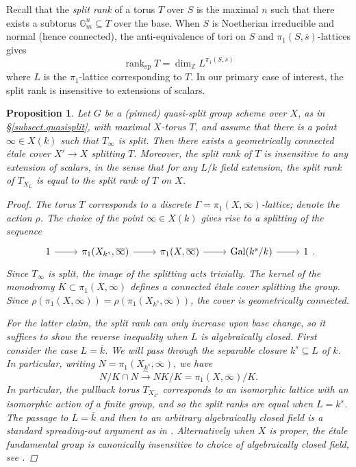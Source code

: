 \documentclass[openany]{amsbook}
\newtheorem{proposition}[theorem]{Proposition}
\theoremstyle{definition}
\theoremstyle{remark}
\numberwithin{equation}{section}
\newcommand{\Z}{\mathbb{Z}}
\newcommand{\G}{\mathbb{G}}
\newcommand{\ol}[1]{\overline{#1}}
\newcommand{\Gal}{\operatorname{Gal}}
\renewcommand{\-}{\operatorname{-}}
\newcommand{\on}[1]{\operatorname{#1}}
\newcommand{\rank}{\on{rank}}
\renewcommand{\sp}{\on{sp}}
\begin{document}
Recall that the \emph{split rank} of a torus $T$ over $S$ is the maximal $n$ such that there exists a subtorus $\G^n_m \subseteq T$ over the base. When $S$ is Noetherian irreducible and normal (hence connected), the anti-equivalence of tori on $S$ and $\pi_1(S, \ol{s})$-lattices gives
\[
    \rank_{\sp} T = \dim_{\Z} L^{\pi_1(S, \ol{s})}
\]
where $L$ is the $\pi_1$-lattice corresponding to $T$. In our primary case of interest, the split rank is insensitive to extensions of scalars.
\begin{proposition}\label{prop.splitrankextensions}
     Let $G$ be a (pinned) quasi-split group scheme over $X$, as in \S \ref{subsect.quasisplit}, with maximal $X$-torus $T$, and assume that there is a point $\infty \in X(k)$ such that $T_{\infty}$ is split. Then there exists a geometrically connected \'etale cover $X' \to X$ splitting $T$. Moreover, the split rank of $T$ is insensitive to any extension of scalars, in the sense that for \textit{any} $L/k$ field extension, the split rank of $T_{X_L}$ is equal to the split rank of $T$ on $X$.
    \begin{proof}
        The torus $T$ corresponds to a discrete $\Gamma = \pi_1(X, \ol{\infty})$-lattice; denote the action $\rho$. The choice of the point $\infty \in X(k)$ gives rise to a splitting of the sequence 
        \[
            \begin{tikzcd}[ampersand replacement=\&]
                1 \ar[r] \& \pi_1(X_{k^s}, \ol{\infty}) \ar[r] \& \pi_1(X, \ol{\infty}) \ar[r] \& \Gal(k^s/k) \ar[r] \& 1
            \end{tikzcd}.
        \]
        Since $T_\infty$ is split, the image of the splitting acts trivially. The kernel of the monodromy $K \subset \pi_1(X, \ol{\infty})$ defines a connected \'etale cover splitting the group. Since $\rho(\pi_1(X, \ol{\infty})) = \rho(\pi_1(X_{k^s}, \ol{\infty}))$, the cover is geometrically connected.
        
        For the latter claim, the split rank can only increase upon base change, so it suffices to show the reverse inequality when $L$ is algebraically closed.  First consider the case $L = \ol{k}$. We will pass through the separable closure $k^s \subseteq L$ of $k$.  In particular, writing $N = \pi_1(X_{k^s}, \ol{\infty})$, we have
        \[
            N/K \cap N \xrightarrow{\sim} NK/K = \pi_1(X, \ol{\infty})/K.
        \]
        In particular, the pullback torus $T_{X_{k^s}}$ corresponds to an isomorphic lattice with an isomorphic action of a finite group, and so the split ranks are equal when $L = k^s$. The passage to $L = \ol{k}$ and then to an arbitrary algebraically closed field is a standard spreading-out argument as in \cite[Prop. 3.2.2]{conradrgs}. Alternatively when $X$ is proper, the \'etale fundamental group is canonically insensitive to choice of algebraically closed field, see \cite[Exp. X, 1.8]{SGAI}.
    \end{proof}
\end{proposition}
\end{document}
